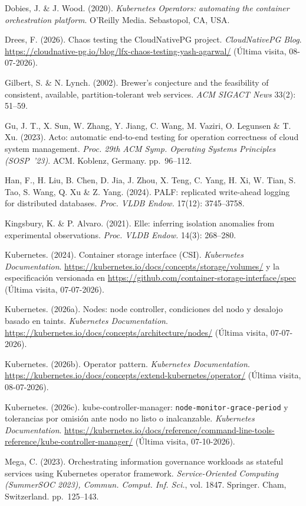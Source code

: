 \documentclass[12pt,twocolumn,letterpaper]{article}
\begin{document}
Dobies, J. \& J. Wood. (2020). \textit{Kubernetes Operators: automating the container orchestration platform}. O'Reilly Media. Sebastopol, CA, USA.\par
Drees, F. (2026). Chaos testing the CloudNativePG project. \textit{CloudNativePG Blog}. \url{https://cloudnative-pg.io/blog/lfx-chaos-testing-yash-agarwal/} (Última visita, 08-07-2026).\par
Gilbert, S. \& N. Lynch. (2002). Brewer's conjecture and the feasibility of consistent, available, partition-tolerant web services. \textit{ACM SIGACT News} 33(2): 51--59.\par
Gu, J. T., X. Sun, W. Zhang, Y. Jiang, C. Wang, M. Vaziri, O. Legunsen \& T. Xu. (2023). Acto: automatic end-to-end testing for operation correctness of cloud system management. \textit{Proc. 29th ACM Symp. Operating Systems Principles (SOSP~'23)}. ACM. Koblenz, Germany. pp.~96--112.\par
Han, F., H. Liu, B. Chen, D. Jia, J. Zhou, X. Teng, C. Yang, H. Xi, W. Tian, S. Tao, S. Wang, Q. Xu \& Z. Yang. (2024). PALF: replicated write-ahead logging for distributed databases. \textit{Proc. VLDB Endow.} 17(12): 3745--3758.\par
Kingsbury, K. \& P. Alvaro. (2021). Elle: inferring isolation anomalies from experimental observations. \textit{Proc. VLDB Endow.} 14(3): 268--280.\par
Kubernetes. (2024). Container storage interface (CSI). \textit{Kubernetes Documentation}. \url{https://kubernetes.io/docs/concepts/storage/volumes/} y la especificación versionada en \url{https://github.com/container-storage-interface/spec} (Última visita, 07-07-2026).\par
Kubernetes. (2026a). Nodes: node controller, condiciones del nodo y desalojo basado en taints. \textit{Kubernetes Documentation}. \url{https://kubernetes.io/docs/concepts/architecture/nodes/} (Última visita, 07-07-2026).\par
Kubernetes. (2026b). Operator pattern. \textit{Kubernetes Documentation}. \url{https://kubernetes.io/docs/concepts/extend-kubernetes/operator/} (Última visita, 08-07-2026).\par
Kubernetes. (2026c). kube-controller-manager: \texttt{node-monitor-grace-period} y tolerancias por omisión ante nodo no listo o inalcanzable. \textit{Kubernetes Documentation}. \url{https://kubernetes.io/docs/reference/command-line-tools-reference/kube-controller-manager/} (Última visita, 07-10-2026).\par
Mega, C. (2023). Orchestrating information governance workloads as stateful services using Kubernetes operator framework. \textit{Service-Oriented Computing (SummerSOC 2023), Commun. Comput. Inf. Sci.}, vol. 1847. Springer. Cham, Switzerland. pp.~125--143.\par
\end{document}
